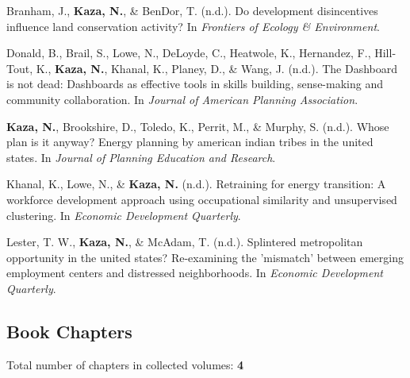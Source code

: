 \documentclass[11pt,a4paper,]{awesome-cv}
\newlength{\cslhangindent}
\newenvironment{CSLReferences}[2] %
 {\begin{list}{}{%
  \setlength{\itemindent}{0pt}
  \setlength{\leftmargin}{0pt}
  \setlength{\parsep}{0pt}
  \ifodd #1
   \setlength{\leftmargin}{\cslhangindent}
   \setlength{\itemindent}{-1\cslhangindent}
  \fi
  \setlength{\itemsep}{#2\baselineskip}}}
 {\end{list}}
\begin{document}
\label{refs-c4ebb341725ba32e88f32ab13c3d0d27}
\begin{CSLReferences}{1}{0}
Branham, J., \textbf{Kaza, N.}, \& BenDor, T. (n.d.). Do development
disincentives influence land conservation activity? In \emph{Frontiers
of Ecology \& Environment}.

Donald, B., Brail, S., Lowe, N., DeLoyde, C., Heatwole, K., Hernandez,
F., Hill-Tout, K., \textbf{Kaza, N.}, Khanal, K., Planey, D., \& Wang,
J. (n.d.). The Dashboard is not dead: Dashboards as effective tools in
skills building, sense-making and community collaboration. In
\emph{Journal of American Planning Association}.

\textbf{Kaza, N.}, Brookshire, D., Toledo, K., Perrit, M., \& Murphy, S.
(n.d.). Whose plan is it anyway? Energy planning by american indian
tribes in the united states. In \emph{Journal of Planning Education and
Research}.

Khanal, K., Lowe, N., \& \textbf{Kaza, N.} (n.d.). Retraining for energy
transition: A workforce development approach using occupational
similarity and unsupervised clustering. In \emph{Economic Development
Quarterly}.

Lester, T. W., \textbf{Kaza, N.}, \& McAdam, T. (n.d.). Splintered
metropolitan opportunity in the united states? Re-examining the
'mismatch' between emerging employment centers and distressed
neighborhoods. In \emph{Economic Development Quarterly}.

\end{CSLReferences}

\subsection{Book Chapters}\label{book-chapters}

Total number of chapters in collected volumes: \textbf{4}
\end{document}

